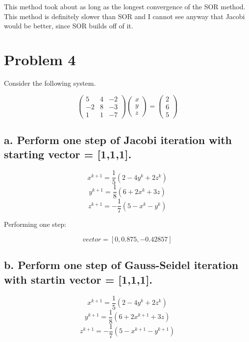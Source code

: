 \documentclass[]{article}
\begin{document}
This method took about as long as the longest convergence of the SOR
method. This method is definitely slower than SOR and I cannot see
anyway that Jacobi would be better, since SOR builds off of it.

\hypertarget{problem-4}{%
\section{Problem 4}\label{problem-4}}

Consider the following system.

\[
\left(\begin{array}{ccc} 
5 & 4 & -2\\
-2 & 8 & -3\\
1 & 1 & -7
\end{array}\right)
\left(\begin{array}{c} 
x \\
y \\
z
\end{array}\right) =
\left(\begin{array}{c}
2 \\
6 \\
5
\end{array}\right)
\]

\hypertarget{a.-perform-one-step-of-jacobi-iteration-with-starting-vector-111.}{%
\subsection{a. Perform one step of Jacobi iteration with starting vector
=
{[}1,1,1{]}.}\label{a.-perform-one-step-of-jacobi-iteration-with-starting-vector-111.}}

\[x^{k+1} = \frac15(2 - 4y^k + 2z^k)\]
\[y^{k+1} = \frac{1}8(6 + 2x^k + 3z)\]
\[z^{k+1} = -\frac17(5 - x^k - y^k)\]

Performing one step:

\[vector = [0, 0.875, -0.42857]\]

\hypertarget{b.-perform-one-step-of-gauss-seidel-iteration-with-startin-vector-111.}{%
\subsection{b. Perform one step of Gauss-Seidel iteration with startin
vector =
{[}1,1,1{]}.}\label{b.-perform-one-step-of-gauss-seidel-iteration-with-startin-vector-111.}}

\[x^{k+1} = \frac15(2 - 4y^k + 2z^k)\]
\[y^{k+1} = \frac{1}8(6 + 2x^{k+1} + 3z)\]
\[z^{k+1} = -\frac17(5 - x^{k+1} - y^{k+1})\]
\end{document}
